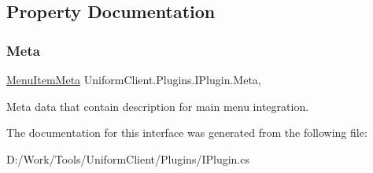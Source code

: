 \subsection{Property Documentation}
\mbox{\label{interface_uniform_client_1_1_plugins_1_1_i_plugin_aa49e267e66a3d697ded460d9281dcc3a}} 
\subsubsection{\texorpdfstring{Meta}{Meta}}
{\footnotesize\ttfamily \mbox{\hyperlink{class_uniform_client_1_1_plugins_1_1_menu_item_meta}{Menu\+Item\+Meta}} Uniform\+Client.\+Plugins.\+I\+Plugin.\+Meta\hspace{0.3cm}{\ttfamily [get]}, {\ttfamily [set]}}



Meta data that contain description for main menu integration. 



The documentation for this interface was generated from the following file\+:\begin{DoxyCompactItemize}
\item 
D\+:/\+Work/\+Tools/\+Uniform\+Client/\+Plugins/I\+Plugin.\+cs\end{DoxyCompactItemize}
